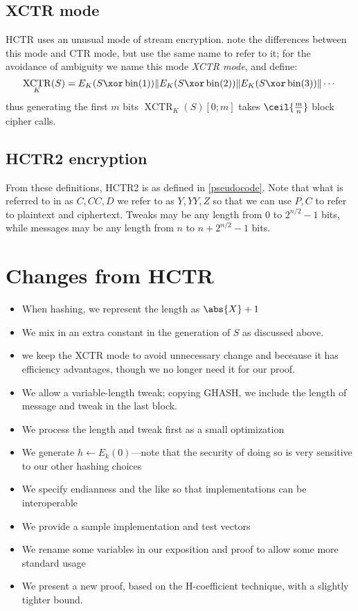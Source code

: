 \documentclass[letterpaper,11pt]{article}
\newcommand*{\Concat}{\Vert}
\DeclareMathOperator{\fromint}{bin}
\DeclareMathOperator{\XCTR}{XCTR}
\begin{document}
\subsection{XCTR mode}

HCTR uses an unusual mode of stream encryption.
\cite{hctr,hctr2} note the differences between this mode and CTR mode,
but use the same name to refer to it; for the avoidance of ambiguity
we name this mode \emph{XCTR mode}, and define:
\begin{displaymath}
    \XCTR_K(S) = E_K(S \xor \fromint(1)) \Concat E_K(S \xor \fromint(2)) \Concat E_K(S \xor \fromint(3)) \Concat \cdots
\end{displaymath}
thus generating the first \(m\) bits \(\XCTR_K(S)[0; m]\) takes \(\ceil{\frac{m}{n}}\) block cipher calls.

\subsection{HCTR2 encryption}

From these definitions, HCTR2 is as defined in \autoref{pseudocode}.
Note that what is referred to in \cite{hctr,hctr2} as \(C, \mathit{CC}, D\)
we refer to as \(Y, YY, Z\)
so that we can use \(P, C\) to refer to plaintext and ciphertext.
Tweaks may be any length from 0 to \(2^{n/2}-1\) bits, while
messages may be any length from \(n\) to \(n + 2^{n/2}-1\) bits.

\section{Changes from HCTR}
\begin{itemize}
    \item When hashing, we represent the length as \(\abs{X} + 1\)
    \item We mix in an extra constant in the generation of \(S\) as discussed above.
    \item we keep the XCTR mode to avoid unnecessary change and beceause it has efficiency
    advantages, though we no longer need it for our proof.
    \item We allow a variable-length tweak; copying GHASH\cite{gcm}, 
    we include the length of message and tweak in the last block. 
    \item We process the length and tweak first as a small optimization
    \item We generate \(h \gets E_k(0)\)---note that the security of doing so is very sensitive to our other hashing choices
    \item We specify endianness and the like so that implementations can be interoperable
    \item We provide a sample implementation and test vectors
    \item We rename some variables in our exposition and proof to allow some more standard usage
    \item We present a new proof, based on the H-coefficient technique, with a slightly tighter bound.
\end{itemize}
\end{document}
